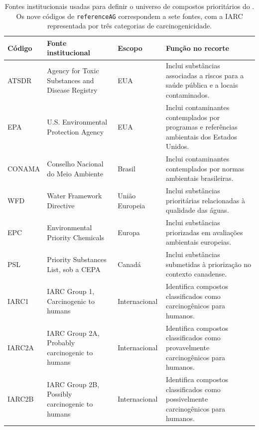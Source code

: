 \begin{table}[htbp]
\centering
\caption{Fontes institucionais usadas para definir o universo de compostos prioritários do \biorempp{}. Os nove códigos de \texttt{referenceAG} correspondem a sete fontes, com a IARC representada por três categorias de carcinogenicidade.}
\label{tab:c1-regulatory-sources}
\footnotesize
\begin{tabularx}{\textwidth}{@{}lXlX@{}}
\toprule
\textbf{Código} & \textbf{Fonte institucional} & \textbf{Escopo} & \textbf{Função no recorte} \\
\midrule
ATSDR
& Agency for Toxic Substances and Disease Registry
& EUA
& Inclui substâncias associadas a riscos para a saúde pública e a locais contaminados. \\

EPA
& U.S. Environmental Protection Agency
& EUA
& Inclui contaminantes contemplados por programas e referências ambientais dos Estados Unidos. \\

CONAMA
& Conselho Nacional do Meio Ambiente
& Brasil
& Inclui contaminantes contemplados por normas ambientais brasileiras. \\

WFD
& Water Framework Directive
& União Europeia
& Inclui substâncias prioritárias relacionadas à qualidade das águas. \\

EPC
& Environmental Priority Chemicals
& Europa
& Inclui substâncias priorizadas em avaliações ambientais europeias. \\

PSL
& Priority Substances List, sob a CEPA
& Canadá
& Inclui substâncias submetidas à priorização no contexto canadense. \\

IARC1
& IARC Group 1, Carcinogenic to humans
& Internacional
& Identifica compostos classificados como carcinogênicos para humanos. \\

IARC2A
& IARC Group 2A, Probably carcinogenic to humans
& Internacional
& Identifica compostos classificados como provavelmente carcinogênicos para humanos. \\

IARC2B
& IARC Group 2B, Possibly carcinogenic to humans
& Internacional
& Identifica compostos classificados como possivelmente carcinogênicos para humanos. \\
\bottomrule
\end{tabularx}
\end{table}

